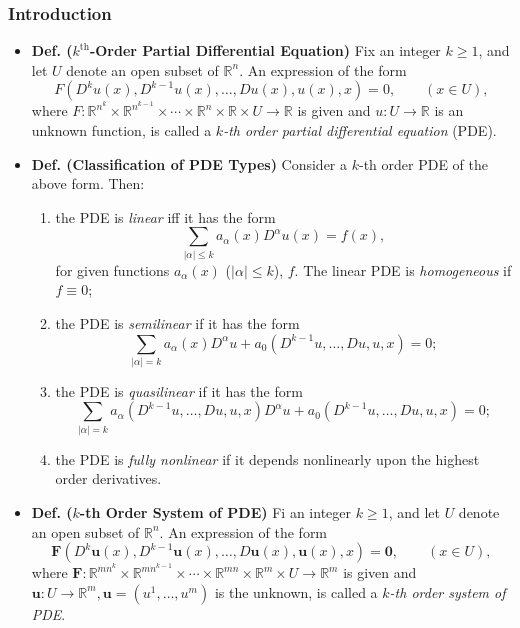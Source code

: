 \documentclass{article}
\begin{document}
	\subsubsection{Introduction}
	\begin{itemize}
		\item \textbf{Def. ($k^{\text{th}}$-Order Partial Differential Equation)} Fix an integer $k \geq 1$, and let $U$ denote an open subset of $\mathbb{R}^{n}$. An expression of the form 
		\begin{equation*}
			F(D^{k}u(x), D^{k-1}u(x), \ldots, Du(x), u(x), x) = 0, \qquad (x \in U), 
		\end{equation*}
		where $F: \mathbb{R}^{n^{k}} \times \mathbb{R}^{n^{k-1}} \times \dotsm \times \mathbb{R}^{n}\times \mathbb{R} \times U \to \mathbb{R}$ is given and $u: U \to \mathbb{R}$ is an unknown function, is called a \textit{$k$-th order partial differential equation} (PDE). 
		
		\item \textbf{Def. (Classification of PDE Types)} Consider a $k$-th order PDE of the above form. Then: \vspace{-0.25cm}
		\begin{enumerate}[itemsep =-2pt,label = (\roman{*})]
			\item the PDE is \textit{linear} iff it has the form 
			\begin{equation*}
				\sum_{|\alpha|\leq k} a_{\alpha}(x)D^{\alpha}u(x) = f(x), 
			\end{equation*}
			for given functions $a_{\alpha}(x)$ ($|\alpha| \leq k$), $f$. The linear PDE is \textit{homogeneous} if $f \equiv 0$;
			\item the PDE is \textit{semilinear} if it has the form 
			\begin{equation*}
				\sum_{|\alpha| = k}a_{\alpha}(x)D^{\alpha}u + a_{0}(D^{k-1}u, \ldots, Du, u, x) = 0;
			\end{equation*}
			\item the PDE is \textit{quasilinear} if it has the form 
			\begin{equation*}
				\sum_{|\alpha| = k}a_{\alpha}(D^{k-1}u, \ldots, Du,u, x)D^{\alpha}u + a_{0}(D^{k-1}u, \ldots, Du, u, x) = 0;
			\end{equation*}
			\item the PDE is \textit{fully nonlinear} if it depends nonlinearly upon the highest order derivatives. 
		\end{enumerate}
		
		\item \textbf{Def. ($k$-th Order System of PDE)} Fi an integer $k \geq 1$, and let $U$ denote an open subset of $\mathbb{R}^{n}$. An expression of the form 
		\begin{equation*}
			\mathbf{F}(D^{k}\mathbf{u}(x), D^{k-1}\mathbf{u}(x), \ldots, D\mathbf{u}(x), \mathbf{u}(x), x) = \mathbf{0}, \qquad (x \in U),
		\end{equation*}
		where $\mathbf{F}: \mathbb{R}^{mn^{k}} \times \mathbb{R}^{mn^{k-1}} \times \dotsm \times \mathbb{R}^{mn} \times \mathbb{R}^{m} \times U \to \mathbb{R}^{m}$ is given and $\mathbf{u}: U \to \mathbb{R}^{m}, \mathbf{u} = (u^{1}, \ldots, u^{m})$ is the unknown, is called a \textit{$k$-th order system of PDE}. 
		

\end{itemize}
\end{document}
